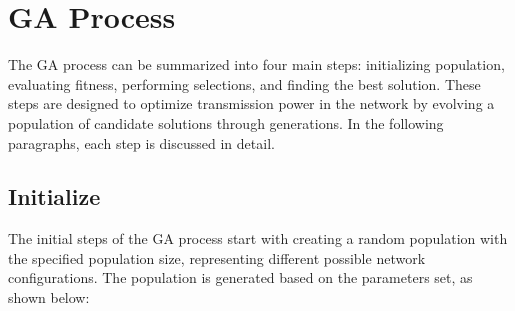 \section{\texorpdfstring{\acrlong{GA}}{GA} Process}\label{sec:genetic_algorithm}

The \gls{GA} process can be summarized into four main steps: initializing population, evaluating fitness, performing selections, and finding the best solution. These steps are designed to optimize transmission power in the network by evolving a population of candidate solutions through generations. In the following paragraphs, each step is discussed in detail.

\subsection{Initialize}

The initial steps of the \gls{GA} process start with creating a random population with the specified population size, representing different possible network configurations. The population is generated based on the parameters set, as shown below:

